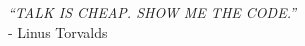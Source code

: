 \clearpage
{}%

\begin{Center}
	\centering \MakeUppercase {\textit{“Talk is cheap. Show me the code.”}}\\
	- Linus Torvalds 
\end{Center}
 
\clearpage